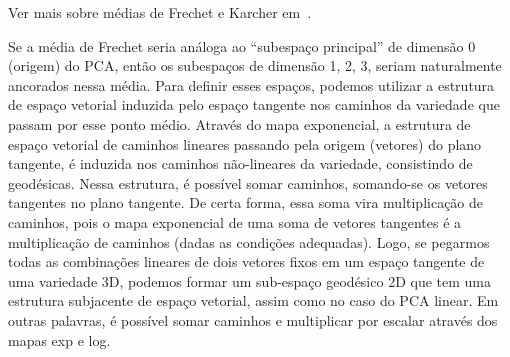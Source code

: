 \documentclass[a4paper,titlepage]{article}
\newcommand{\draftnote}[1]{\marginpar{\tiny\raggedright\textsf{\textcolor{blue}{\hspace{0pt}#1}}}}
\begin{document}
Ver mais sobre médias de Frechet e Karcher
em~\cite{Pennec:Advances:Chapter:2020}.


\begin{center}
\vspace{1em}
\vspace{1em}
\end{center}
\begin{center}
\vspace{1em}
\vspace{1em}
\end{center}

Se a média de Frechet seria análoga ao ``subespaço principal''  de dimensão 0
(origem) do PCA, então os subespaços de dimensão 1, 2, 3, seriam naturalmente
ancorados nessa média. Para definir esses espaços, podemos utilizar a estrutura
de espaço vetorial induzida pelo espaço tangente nos caminhos da variedade que passam por esse ponto
médio. Através do mapa exponencial, a estrutura de espaço vetorial de caminhos
lineares passando pela origem (vetores) do plano tangente, é induzida nos caminhos
não-lineares da variedade, consistindo de geodésicas. Nessa estrutura, é
possível somar caminhos, somando-se os vetores tangentes no plano tangente.
De certa forma, essa soma vira multiplicação de caminhos, pois o mapa
exponencial de uma soma de vetores tangentes é a multiplicação de caminhos
(dadas as condições adequadas).
Logo, se pegarmos todas as combinações lineares de dois vetores fixos em um espaço
tangente de uma variedade 3D, podemos formar um sub-espaço geodésico 2D que tem
uma estrutura subjacente de espaço vetorial, assim como no caso do PCA linear.
Em outras palavras, é possível somar caminhos e multiplicar por escalar através
dos mapas exp e log.
\draftnote{fabbri: elaborar}
\end{document}
